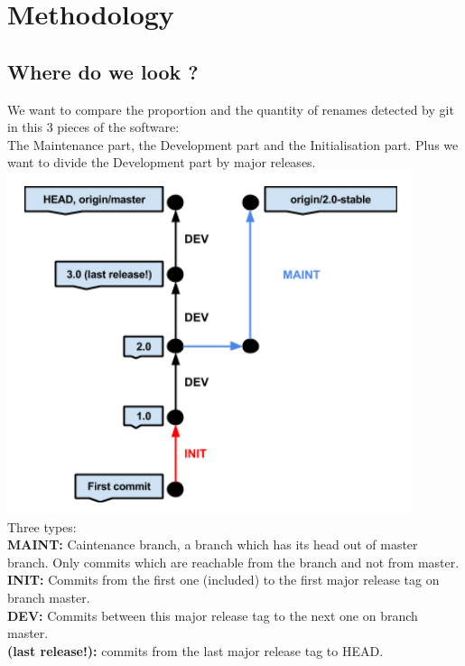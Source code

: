 \section{Methodology}
\subsection{Where do we look ?}
We want to compare the proportion and the quantity of renames detected by git in this 3 pieces of the software:\\
The Maintenance part, the Development part and the Initialisation part. Plus we want to divide the Development part by major releases.\\
\includegraphics[scale=0.5]{illustrations/draw1}\\
Three types:\\
\textbf{MAINT:} Caintenance branch, a branch which has its head out of master branch. Only commits which are reachable from the branch and not from master.\\
\textbf{INIT:} Commits from the first one (included) to the first major release tag on branch master.\\
\textbf{DEV:} Commits between this major release tag to the next one on branch master.\\
\textbf{(last release!):} commits from the last major release tag to HEAD.\\
\label{subsec:Where do we look ?}
